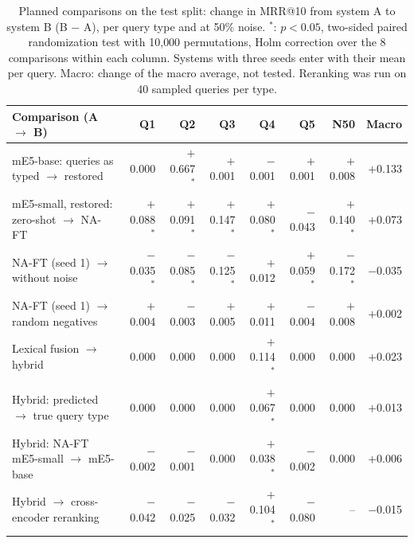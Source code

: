 \begin{table}[t]
\centering
\caption{Planned comparisons on the test split: change in MRR@10 from system A to system B (B $-$ A), per query
type and at 50\% noise. $^{*}$: $p<0.05$, two-sided paired randomization test with 10{,}000 permutations, Holm
correction over the 8 comparisons within each column. Systems with three seeds enter with their mean per
query. Macro: change of the macro average, not tested. Reranking was run on 40 sampled queries per type.}
\label{tab:planned}
\footnotesize
\setlength{\tabcolsep}{4pt}
\begin{tabular}{@{}l rrrrr r r@{}}
\toprule
Comparison (A $\rightarrow$ B) & Q1 & Q2 & Q3 & Q4 & Q5 & N50 & Macro \\
\midrule
mE5-base: queries as typed $\rightarrow$ restored & 0.000 & \ensuremath{+}0.667$^{*}$ & \ensuremath{+}0.001 & \ensuremath{-}0.001 & \ensuremath{+}0.001 & \ensuremath{+}0.008 & \ensuremath{+}0.133 \\
mE5-small, restored: zero-shot $\rightarrow$ NA-FT & \ensuremath{+}0.088$^{*}$ & \ensuremath{+}0.091$^{*}$ & \ensuremath{+}0.147$^{*}$ & \ensuremath{+}0.080$^{*}$ & \ensuremath{-}0.043 & \ensuremath{+}0.140$^{*}$ & \ensuremath{+}0.073 \\
NA-FT (seed 1) $\rightarrow$ without noise & \ensuremath{-}0.035$^{*}$ & \ensuremath{-}0.085$^{*}$ & \ensuremath{-}0.125$^{*}$ & \ensuremath{+}0.012 & \ensuremath{+}0.059$^{*}$ & \ensuremath{-}0.172$^{*}$ & \ensuremath{-}0.035 \\
NA-FT (seed 1) $\rightarrow$ random negatives & \ensuremath{+}0.004 & \ensuremath{-}0.003 & \ensuremath{+}0.005 & \ensuremath{+}0.011 & \ensuremath{-}0.004 & \ensuremath{+}0.008 & \ensuremath{+}0.002 \\
Lexical fusion $\rightarrow$ hybrid & 0.000 & 0.000 & 0.000 & \ensuremath{+}0.114$^{*}$ & 0.000 & 0.000 & \ensuremath{+}0.023 \\
Hybrid: predicted $\rightarrow$ true query type & 0.000 & 0.000 & 0.000 & \ensuremath{+}0.067$^{*}$ & 0.000 & 0.000 & \ensuremath{+}0.013 \\
Hybrid: NA-FT mE5-small $\rightarrow$ mE5-base & \ensuremath{-}0.002 & \ensuremath{-}0.001 & 0.000 & \ensuremath{+}0.038$^{*}$ & \ensuremath{-}0.002 & 0.000 & \ensuremath{+}0.006 \\
Hybrid $\rightarrow$ cross-encoder reranking & \ensuremath{-}0.042 & \ensuremath{-}0.025 & \ensuremath{-}0.032 & \ensuremath{+}0.104$^{*}$ & \ensuremath{-}0.080 & -- & \ensuremath{-}0.015 \\
\bottomrule
\end{tabular}
\end{table}
